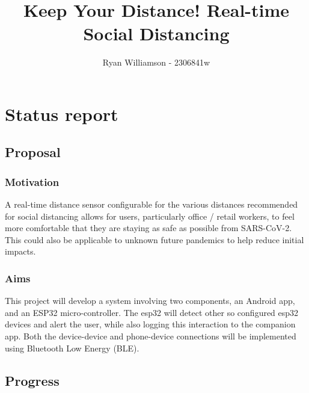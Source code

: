 \documentclass[11pt]{article}
\title{Keep Your Distance! Real-time Social Distancing}
\author{Ryan Williamson - 2306841w}
\begin{document}
    \maketitle
    
    
     

\section{Status report}

\subsection{Proposal}\label{proposal}

\subsubsection{Motivation}\label{motivation}

A real-time distance sensor configurable for the various distances recommended 
for social distancing allows for users, particularly office / retail 
workers, to feel more comfortable that they are staying as safe as 
possible from SARS-CoV-2. This could also be applicable to unknown 
future pandemics to help reduce initial impacts.

\subsubsection{Aims}\label{aims}

This project will develop a system involving two components, an 
Android app, and an ESP32 micro-controller. The esp32 will detect 
other so configured esp32 devices and alert the user, while also 
logging this interaction to the companion app. Both the device-device 
and phone-device connections will be implemented using Bluetooth Low 
Energy (BLE).

\subsection{Progress}\label{progress}
\end{document}
